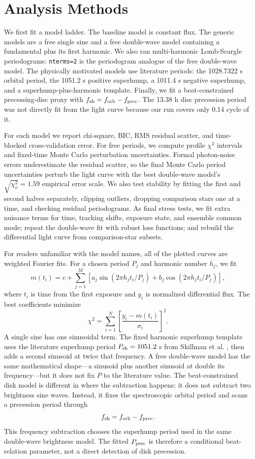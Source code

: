 \documentclass[11pt]{article}
\begin{document}
\section{Analysis Methods}

We first fit a model ladder.  The baseline model is constant flux.  The
generic models are a free single sine and a free double-wave model containing a
fundamental plus its first harmonic.  We also ran multi-harmonic
Lomb-Scargle periodograms: \texttt{nterms=2} is the periodogram analogue of the
free double-wave model.  The physically motivated models use literature
periods: the 1028.7322 s orbital period, the 1051.2 s positive superhump, a
1011.4 s negative superhump, and a superhump-plus-harmonic template.  Finally,
we fit a beat-constrained precessing-disc proxy with
\(f_{\rm sh}=f_{\rm orb}-f_{\rm prec}\).  The 13.38 h disc precession period
was not directly fit from the light curve because our run covers only 0.14
cycle of it.

For each model we report chi-square, BIC, RMS residual scatter, and
time-blocked cross-validation error.  For free periods, we compute profile
\(\chi^2\) intervals and fixed-time Monte Carlo perturbation uncertainties.
Formal photon-noise errors underestimate the residual scatter, so the final
Monte Carlo period uncertainties perturb the light curve with the best
double-wave model's \(\sqrt{\chi^2_\nu}=1.59\) empirical error scale.  We
also test stability by fitting the first and second halves separately, clipping
outliers, dropping comparison stars one at a time, and checking residual
periodograms.  As final stress tests, we fit extra nuisance terms for time,
tracking shifts, exposure state, and ensemble common mode; repeat the
double-wave fit with robust loss functions; and rebuild the differential light
curve from comparison-star subsets.

For readers unfamiliar with the model names, all of the plotted curves are
weighted Fourier fits.  For a chosen period \(P_j\) and harmonic number \(h_j\),
we fit
\[
m(t_i)=c+\sum_{j=1}^{M}\left[
a_j\sin\left(2\pi h_jt_i/P_j\right)+
b_j\cos\left(2\pi h_jt_i/P_j\right)\right],
\]
where \(t_i\) is time from the first exposure and \(y_i\) is normalized
differential flux.  The best coefficients minimize
\[
\chi^2=\sum_{i=1}^{N}\left[\frac{y_i-m(t_i)}{\sigma_i}\right]^2 .
\]
A single sine has one sinusoidal term.  The fixed harmonic superhump template
uses the literature superhump period \(P_{\rm sh}=1051.2\) s from Skillman et
al. \cite{skillman1999}, then adds a second sinusoid at twice that frequency.
A free double-wave model has the same mathematical shape---a sinusoid plus
another sinusoid at double its frequency---but it does not fix \(P\) to the
literature value.  The beat-constrained disk model is different in where the
subtraction happens: it does not subtract two brightness sine waves.  Instead,
it fixes the spectroscopic orbital period and scans a precession period through
\[
f_{\rm sh}=f_{\rm orb}-f_{\rm prec}.
\]
This frequency subtraction chooses the superhump period used in the same
double-wave brightness model.  The fitted \(P_{\rm prec}\) is therefore a
conditional beat-relation parameter, not a direct detection of disk precession.
\end{document}
